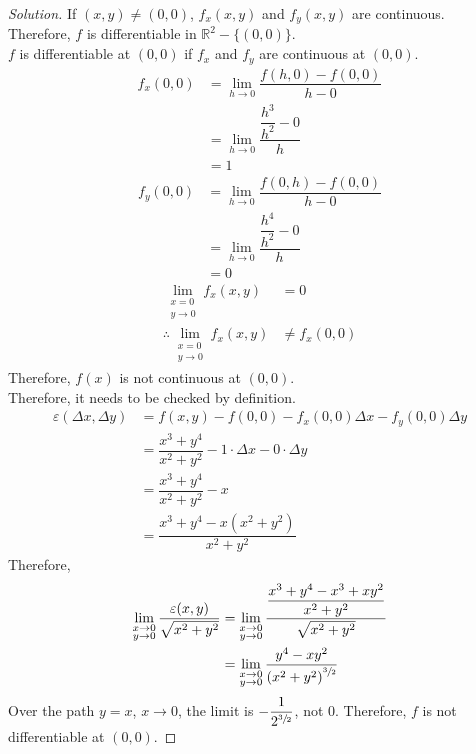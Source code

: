 \documentclass[fleqn, 12pt]{article}
\theoremstyle{definition}
\theoremstyle{theorem}
\newenvironment{solution}
{\begin{proof}[Solution]\let\qed\relax}
	{\end{proof}}
\begin{document}
\begin{solution}
	If $(x,y) \neq (0,0)$, $f_x(x,y)$ and $f_y(x,y)$ are continuous. Therefore, $f$ is differentiable in $\mathbb{R}^2 - \{(0,0)\}$.\\
	$f$ is differentiable at $(0,0)$ if $f_x$ and $f_y$ are continuous at $(0,0)$.
	\begin{align*}
		f_x(0,0) &= \lim\limits_{h \to 0} \dfrac{f(h,0) - f(0,0)}{h - 0}\\
		&= \lim\limits_{h \to 0} \dfrac{\dfrac{h^3}{h^2} - 0}{h}\\
		&= 1
	\end{align*}
	\begin{align*}
		f_y(0,0) &= \lim\limits_{h \to 0} \dfrac{f(0,h) - f(0,0)}{h - 0}\\
		&= \lim\limits_{h \to 0} \dfrac{\dfrac{h^4}{h^2} - 0}{h}\\
		&= 0
	\end{align*}
	\begin{align*}
		\lim\limits_{\substack{x = 0\\ y \to 0}} f_x(x,y) &= 0\\
		\therefore \lim\limits_{\substack{x = 0\\ y \to 0}} f_x(x,y) &\neq f_x(0,0)
	\end{align*}
	Therefore, $f(x)$ is not continuous at $(0,0)$.\\
	Therefore, it needs to be checked by definition.
	\begin{align*}
		\varepsilon(\Delta x, \Delta y) &= f(x,y) - f(0,0) - f_x(0,0) \Delta x - f_y(0,0) \Delta y\\
		&= \dfrac{x^3 + y^4}{x^2 + y^2} - 1 \cdot \Delta x - 0\cdot \Delta y\\
		&= \dfrac{x^3 + y^4}{x^2 + y^2} - x\\
		&= \dfrac{x^3 + y^4 - x(x^2 + y^2)}{x^2 + y^2}
	\end{align*}
	Therefore,
	\begin{align*}
		\lim\limits_{\substack{x \to 0\\ y \to 0}} \dfrac{\varepsilon(x,y)}{\sqrt{x^2 + y^2}} &= \lim\limits_{\substack{x \to 0\\ y \to 0}} \dfrac{\dfrac{x^3 + y^4 - x^3 + xy^2}{x^2 + y^2}}{\sqrt{x^2 + y^2}}\\
		&= \lim\limits_{\substack{x \to 0\\ y \to 0}} \dfrac{y^4 - xy^2}{\left( x^2 + y^2 \right)^{\sfrac{3}{2}}}
	\end{align*}
	Over the path $y = x$, $x \to 0$, the limit is $-\dfrac{1}{2^{\sfrac{3}{2}}}$, not $0$. Therefore, $f$ is not differentiable at $(0,0)$.
\end{solution}
\end{document}
